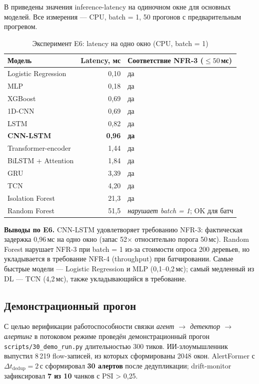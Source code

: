 В  приведены значения inference-latency на
одиночном окне для основных моделей. Все измерения --- CPU, batch = 1,
50 прогонов с предварительным прогревом.

\begin{table}[H]
\centering
\caption{Эксперимент E6: latency на одно окно (CPU, batch = 1)}
\label{tab:E6-latency}
\renewcommand{\arraystretch}{1.2}
\begin{tabular}{lrl}
\toprule
\textbf{Модель} & \textbf{Latency, мс} & \textbf{Соответствие NFR-3 ($\leq 50$\,мс)} \\
\midrule
Logistic Regression & 0{,}10  & да \\
MLP                 & 0{,}18  & да \\
XGBoost             & 0{,}69  & да \\
1D-CNN              & 0{,}69  & да \\
LSTM                & 0{,}82  & да \\
\textbf{CNN-LSTM}   & \textbf{0{,}96} & \textbf{да} \\
Transformer-encoder & 1{,}44  & да \\
BiLSTM + Attention  & 1{,}84  & да \\
GRU                 & 3{,}39  & да \\
TCN                 & 4{,}20  & да \\
Isolation Forest    & 21{,}3  & да \\
Random Forest       & 51{,}5  & \emph{нарушает batch = 1}; OK для батч \\
\bottomrule
\end{tabular}
\end{table}

\textbf{Выводы по E6.} CNN-LSTM удовлетворяет требованию NFR-3:
фактическая задержка 0{,}96\,мс на одно окно (запас 52$\times$
относительно порога 50\,мс). Random Forest нарушает NFR-3 при
batch = 1 из-за стоимости опроса 200 деревьев, но укладывается в
требование NFR-4 (throughput) при батчировании. Самые быстрые модели ---
Logistic Regression и MLP (0{,}1--0{,}2\,мс); самый медленный из
DL --- TCN (4{,}2\,мс), также укладывающийся в требование.

\subsection{Демонстрационный прогон}

С целью верификации работоспособности связки
\emph{агент $\to$ детектор $\to$ алертинг} в потоковом режиме
проведён демонстрационный прогон \texttt{scripts/30\_demo\_run.py}
длительностью 300 тиков. ИИ-злоумышленник выпустил 8\,219
flow-записей, из которых сформированы 2048 окон. AlertFormer с
\(\Delta t_{\text{dedup}} = 2\)\,с сформировал \textbf{30 алертов}
после дедупликации; drift-monitor зафиксировал \textbf{7 из 10}
чанков с PSI > 0{,}25.

